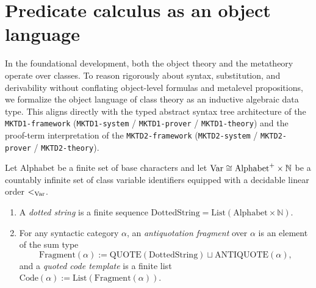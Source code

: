 \section{Predicate calculus as an object language}
\label{subsec:object_language_predicate_calculus}

In the foundational development, both the object theory and the metatheory operate over classes. To reason rigorously about syntax, substitution, and derivability without conflating object-level formulas and metalevel propositions, we formalize the object language of class theory as an inductive algebraic data type. This aligns directly with the typed abstract syntax tree architecture of the \texttt{MKTD1-framework} (\texttt{MKTD1-system} / \texttt{MKTD1-prover} / \texttt{MKTD1-theory}) and the proof-term interpretation of the \texttt{MKTD2-framework} (\texttt{MKTD2-system} / \texttt{MKTD2-prover} / \texttt{MKTD2-theory}).

\begin{definition}
\label{def:object_language_alphabet}
Let $\mathrm{Alphabet}$ be a finite set of base characters and let $\mathrm{Var} \cong \mathrm{Alphabet}^+ \times \mathbb{N}$ be a countably infinite set of class variable identifiers equipped with a decidable linear order $<_{\mathrm{Var}}$.
\begin{enumerate}
\item A \emph{dotted string} is a finite sequence $\mathrm{DottedString} = \mathrm{List}(\mathrm{Alphabet} \times \mathbb{N})$.
\item For any syntactic category $\alpha$, an \emph{antiquotation fragment} over $\alpha$ is an element of the sum type
\[
\mathrm{Fragment}(\alpha) := \mathrm{QUOTE}(\mathrm{DottedString}) \sqcup \mathrm{ANTIQUOTE}(\alpha),
\]
and a \emph{quoted code template} is a finite list $\mathrm{Code}(\alpha) := \mathrm{List}(\mathrm{Fragment}(\alpha))$.
\end{enumerate}
\end{definition}

